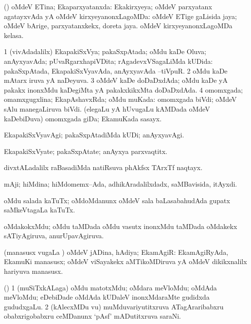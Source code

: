 \bentry
{}
\gl{\gu}
\bmng
(\AmA) oMdeV ETina; Ekaparxyatanxda: Ekakirxyeya; oMdeV parxyatanx agatayxvAda yA oMdeV kirxyeyanonxLagoMDa:  oMdeV ETige gaLisida jaya; oMdeV bArige, parxyatanxkekx, doreta jaya.  oMdeV kirxyeyanonxLagoMDa kelasa. 
\emng
\eentry

\bentry
{}
\gl{\gu}
\bmng
\bnum
\num{1} (vivAdadalilx) EkapakiSxVya; pakaSxpAtada; oMdu kaDe Oluva; anAyxyavAda; pUvaRgarxhapiVDita; rAgadevxVSagaLiMda kUDida:  pakaSxpAtada, EkapakiSxVyavAda, anAyxyavAda --tiVpuR. 
\num{2} oMdu kaDe mAtarx iruva yA naDeyuva. 
\num{3} oMdeV kaDe doDaDxdAda; oMdu kaDe yA pakakx inonxMdu kaDegiMta yA pakakxkikxMta doDaDxdAda. 
\num{4} omomxgada; omamxgugxlina; EkapAshavxRda; oMdu muKada:  omomxgada biVdi; oMdeV sAlu manegaLiruva biVdi.  (elegaLu yA hUvugaLu kAMDada oMdeV kaDebiDuva) omomxgada giDa; EkamuKada sasayx. 
\enum
\emng
\eentry

\bentry
{}
\gl{\kirxvi}
\bmng
EkapakiSxVyavAgi; pakaSxpAtadiMda kUDi; anAyxyavAgi. 
\emng
\eentry

\bentry
{}
\gl{\nA}
\bmng
EkapakiSxVyate; pakaSxpAtate; anAyxya parxvaqtitx. 
\emng
\eentry

\bentry
{}
\gl{\nA}
\bmng
divxtALadalilx raBasadiMda natiRsuva phAkfsx TArxTf naqtayx. 
\emng
\eentry

\bentry
{}
\gl{\gu}
\bmng
mAji; hiMdina; hiMdomemx--Ada, adhikAradalilxdadx, saMBavisida, itAyxdi. 
\emng
\eentry

\bentry
{}
\gl{\nA}
\bmng
oMdu salada kaTuTx; oMdoMdanunx oMdeV sala baLasabahudAda gupatx saMkeVtagaLa kaTuTx. 
\emng
\eentry

\bentry
{}
\gl{\gu}
\bmng
oMdakokxMdu; oMdu taMDada oMdu vasutx inonxMdu taMDada oMdakekx sATiyAgiruva, anurUpavAgiruva. 
\emng
\eentry

\bentry
{}
\gl{\gu}
\bmng
(manasusx \mo vugaLa \vi) oMdeV jADina, hAdiya; EkamAgiR:  EkamAgiRyAda, EkamuKi manasusx; oMdeV viSayakekx aMTikoMDiruva yA oMdeV dikikxnalilx hariyuva manasusx. 
\emng
\eentry

\bentry
{}
\gl{\nA}
\bmng
(\AmA) 
\bnum
\num{1} (muSiTxkALaga) oMdu matotxMdu; oMdara meVloMdu; oMdAda meVloMdu; eDebiDade oMdAda kUDaleV inonxMdaraMte gudidxda gududxgaLu. 
\num{2} (kAlecxMDu \mo vu) muMduvariyutitxruva ATagAraribabxru obabxrigobabxru ceMDanunx `pAsf' mADutitxruva saraNi. 
\enum
\emng
\eentry

